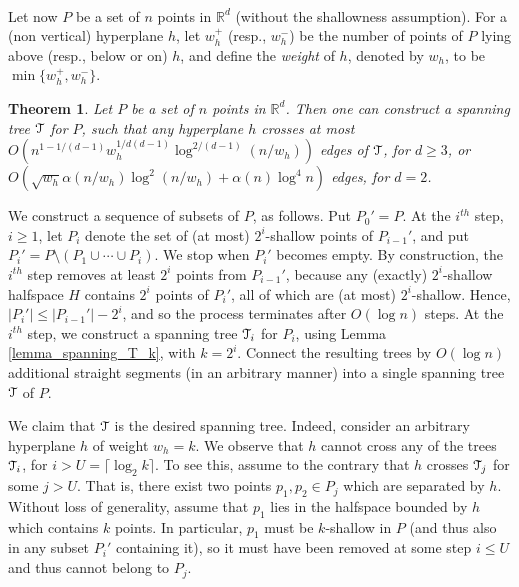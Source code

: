 \documentclass[11pt]{article}
\newtheorem{theorem}{Theorem}[section]
\newcommand{\Tree}{\EuScript{T}}
\def\reals{\mathbb R}
\begin{document}
\paragraph{}
Let now $P$ be a set of $n$ points in $\reals^{d}$ (without the shallowness assumption). For a (non vertical) hyperplane $h$, let $w_{h}^{+}$ (resp., $w_{h}^{-}$) be the number of points of $P$ lying above (resp., below or on) $h$, and define the \emph{weight} of $h$, denoted by $w_{h}$, to be $\min\{w_{h}^{+}, w_{h}^{-}\}$.

\begin{theorem} \label{thm_spanning_T}
Let $P$ be a set of $n$ points in $\reals^{d}$. Then one can construct a spanning tree $\EuScript{T}$ for $P$, such that any hyperplane $h$ crosses at most $O\left(n^{1-1/(d-1)}w_{h}^{1/d(d-1)}\log^{2/(d-1)}(n/w_{h})\right)$ edges of $\EuScript{T}$, for $d \geq 3$, or $O\left(\sqrt{w_{h}}\alpha(n/w_{h})\log^{2}(n/w_{h}) + \alpha(n)\log^{4}n \right)$ edges, for $d = 2$.
\end{theorem}

 We construct a sequence of subsets of $P$, as follows. Put $P_{0}' = P$. At the $i^{th}$ step, $i \geq 1$, let $P_{i}$ denote the set of (at most) $2^{i}$-shallow points of $P_{i-1}'$, and put $P_{i}' = P  \setminus (P_{1}\cup \cdots \cup P_{i})$. We stop when $P_{i}'$ becomes empty. By construction, the $i^{th}$ step removes at least $2^{i}$ points from $P_{i-1}'$, because any (exactly) $2^{i}$-shallow halfspace $H$ contains $2^{i}$ points of $P_{i}'$, all of which are (at most) $2^{i}$-shallow. Hence, $|P_{i}'| \leq |P_{i-1}'| - 2^{i}$, and so the process terminates after $O(\log n)$ steps. At the $i^{th}$ step, we construct a spanning tree $\Tree_{i}$ for $P_{i}$, using Lemma \ref{lemma_spanning_T_k}, with $k = 2^{i}$. Connect the resulting trees by $O(\log n)$ additional straight segments (in an arbitrary manner) into a single spanning tree $\Tree$ of $P$.

We claim that $\Tree$ is the desired spanning tree. Indeed, consider an arbitrary hyperplane $h$ of weight $w_{h} = k$. We observe that $h$ cannot cross any of the trees $\Tree_{i}$, for $i > U = \lceil \log_{2} k \rceil$. To see this, assume to the contrary that $h$ crosses $\Tree_{j}$ for some $j > U$. That is, there exist two points $p_{1}, p_{2} \in P_{j}$ which are separated by $h$. Without loss of generality, assume that $p_{1}$ lies in the halfspace bounded by $h$ which contains $k$ points. In particular, $p_{1}$ must be $k$-shallow in $P$ (and thus also in any subset $P_{i}'$ containing it), so it must have been removed at some step $i \leq U$ and thus cannot belong to $P_{j}$.
\end{document}
